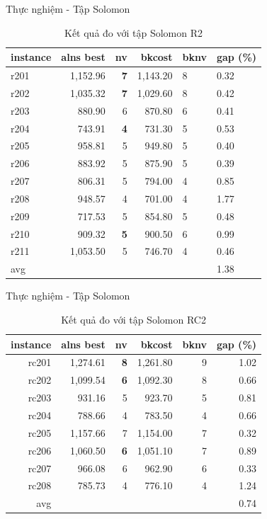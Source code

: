 \begin{frame}{Thực nghiệm - Tập Solomon}
  \begin{table}
    \small
    \centering
    \begin{tabular}{lrrrll}
    \hline
    instance & alns best & nv & bkcost & bknv & gap (\%) \\ \hline
    r201 & 1,152.96 & \textbf{7} & 1,143.20 & 8 & 0.32 \\ \hline
    r202 & 1,035.32 & \textbf{7} & 1,029.60 & 8 & 0.42 \\ \hline
    r203 & 880.90 & 6 & 870.80 & 6 & 0.41 \\ \hline
    r204 & 743.91 & \textbf{4} & 731.30 & 5 & 0.53 \\ \hline
    r205 & 958.81 & 5 & 949.80 & 5 & 0.40 \\ \hline
    r206 & 883.92 & 5 & 875.90 & 5 & 0.39 \\ \hline
    r207 & 806.31 & 5 & 794.00 & 4 & 0.85 \\ \hline
    r208 & 948.57 & 4 & 701.00 & 4 & 1.77 \\ \hline
    r209 & 717.53 & 5 & 854.80 & 5 & 0.48 \\ \hline
    r210 & 909.32 & \textbf{5} & 900.50 & 6 & 0.99 \\ \hline
    r211 & 1,053.50 & 5 & 746.70 & 4 & 0.46 \\ \hline
    avg &  &  &  &  & 1.38 \\ \hline
    \end{tabular}
    \caption{Kết quả đo với tập Solomon R2}
  \end{table}
\end{frame}

\begin{frame}{Thực nghiệm - Tập Solomon}
  \begin{table}[, label=exp:solomonRC2, placement=h]
    \small
    \centering
    \begin{tabular}{rrrrrr}
    \hline
    instance & alns best & nv & bkcost & bknv & gap (\%) \\ \hline
    rc201 & 1,274.61 & \textbf{8} & 1,261.80 & 9 & 1.02 \\ \hline
    rc202 & 1,099.54 & \textbf{6} & 1,092.30 & 8 & 0.66 \\ \hline
    rc203 & 931.16 & 5 & 923.70 & 5 & 0.81 \\ \hline
    rc204 & 788.66 & 4 & 783.50 & 4 & 0.66 \\ \hline
    rc205 & 1,157.66 & 7 & 1,154.00 & 7 & 0.32 \\ \hline
    rc206 & 1,060.50 & \textbf{6} & 1,051.10 & 7 & 0.89 \\ \hline
    rc207 & 966.08 & 6 & 962.90 & 6 & 0.33 \\ \hline
    rc208 & 785.73 & 4 & 776.10 & 4 & 1.24 \\ \hline
    avg &  &  &  &  & 0.74 \\ \hline
    \end{tabular}
    \caption{Kết quả đo với tập Solomon RC2}
  \end{table}
\end{frame}

